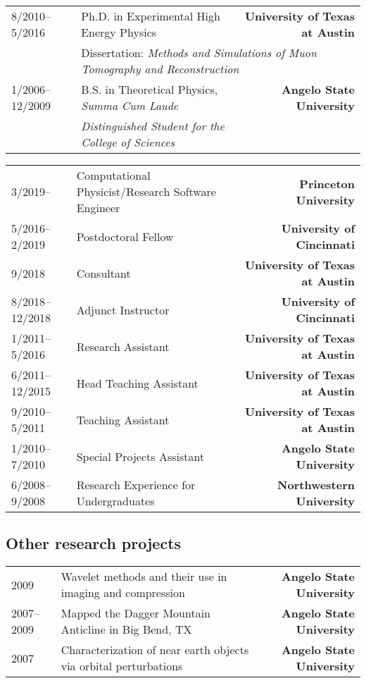 \documentclass[10pt,letterpaper,english]{moderncv}
\begin{document}
\let\oldnullthing\null
\renewcommand{\null}{}
\makecvtitle
\renewcommand{\null}{\oldnullthing}
\vspace*{-10mm}


\begin{tabularx}{\textwidth}{p{1.1in}X>{\bfseries}r}
	8/2010--5/2016 & Ph.D. in Experimental High Energy Physics &  University of Texas at Austin \\
	& \multicolumn{2}{l}{Dissertation: \textit{Methods and Simulations of Muon Tomography and Reconstruction}} \\[1ex]
	1/2006--12/2009 & B.S. in Theoretical Physics, \textit{Summa Cum Laude} & Angelo State University \\
	& \textit{Distinguished Student for the College of Sciences} & \\
\end{tabularx}


\begin{tabularx}{\textwidth}{p{1.1in}X>{\bfseries}r}
    3/2019-- & Computational Physicist/Research Software Engineer & Princeton University \\
	5/2016--2/2019 & Postdoctoral Fellow &  University of Cincinnati \\
	9/2018 & Consultant & University of Texas at Austin \\
	8/2018--12/2018 & Adjunct Instructor &  University of Cincinnati \\
	1/2011--5/2016 & Research Assistant & University of Texas at Austin \\
	6/2011--12/2015 & Head Teaching Assistant & University of Texas at Austin \\
	9/2010--5/2011 & Teaching Assistant & University of Texas at Austin \\
	1/2010--7/2010 & Special Projects Assistant & Angelo State University \\
	6/2008--9/2008 & Research Experience for Undergraduates & Northwestern University \\
\end{tabularx}

\subsection{Other research projects}

\begin{tabularx}{\textwidth}{p{1.1in}X>{\bfseries}r}
	2009 & Wavelet methods and their use in imaging and compression &  Angelo State University \\
	2007--2009 & Mapped the Dagger Mountain Anticline in Big Bend, TX & Angelo State University \\
	2007 & Characterization of near earth objects via orbital perturbations & Angelo State University \\
\end{tabularx}
\end{document}
